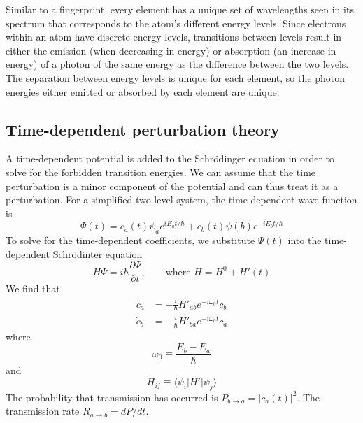 Similar to a fingerprint, every element has a unique set of wavelengths seen in 
its spectrum that corresponds to the atom's different energy levels.  Since 
electrons within an atom have discrete energy levels, transitions between levels 
result in either the emission (when decreasing in energy) or absorption 
(an increase in energy) of a photon of the same energy as the difference between 
the two levels.  The separation between energy levels is unique for each 
element, so the photon energies either emitted or absorbed by each element are 
unique.


\subsection{Time-dependent perturbation theory}

A time-dependent potential is added to the Schr\"{o}dinger equation in order to 
solve for the forbidden transition energies.  We can assume that the time 
perturbation is a minor component of the potential and can thus treat it as a 
perturbation.  For a simplified two-level system, the time-dependent wave 
function is
\begin{equation}
    \Psi (t) = c_a (t) \psi_a e^{iE_a t/\hbar} + c_b (t) \psi (b) e^{-iE_b t/\hbar}
\end{equation}
To solve for the time-dependent coefficients, we substitute $\Psi (t)$ into the 
time-dependent Schr\"{o}dinter equation
\begin{equation}
    H\Psi = i\hbar \frac{\partial \Psi}{\partial t}, \qquad \text{where } H = H^0 + H'(t)
\end{equation}
We find that
\begin{align}
    \dot{c}_a &= -\frac{i}{\hbar} H'_{ab} e^{-i\omega_0 t} c_b\\
    \dot{c}_b &= -\frac{i}{\hbar} H'_{ba} e^{-i\omega_0 t} c_a
\end{align}
where
\begin{equation}
    \omega_0 \equiv \frac{E_b - E_a}{\hbar}
\end{equation}
and
\begin{equation}
    H_{ij} \equiv \langle \psi_i | H' | \psi_j \rangle
\end{equation}
The probability that transmission has occurred is $P_{b\to a} = |c_a (t)|^2$.  
The transmission rate $R_{a\to b} = dP/dt$.


